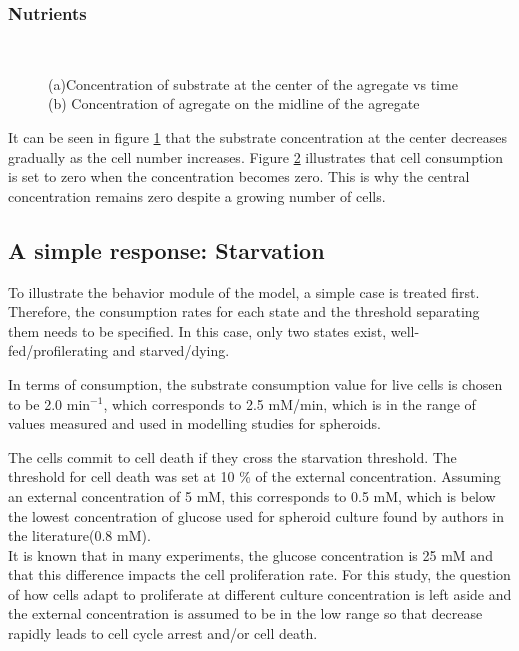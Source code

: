 \documentclass[11pt,a4paper]{article}
\begin{document}
\subsubsection{Nutrients}
\begin{figure}[ht!]
\begin{subfigure}{0.5\textwidth}
	\centering
	
	\caption{ \label{ref_S_center}}
\end{subfigure}
~~
\begin{subfigure}{0.5\textwidth}
	\centering
	
	\caption{\label{S_ref_midline}}
\end{subfigure}
\caption{(a)Concentration of substrate at the center of the agregate vs time (b) Concentration of agregate on the midline of the agregate \label{ref_nutrients}}
\end{figure}

It can be seen in figure \ref{ref_S_center} that the  substrate concentration at the center decreases gradually as the cell number increases. Figure \ref{S_ref_midline} illustrates that cell consumption is set to zero when the concentration becomes zero. This is why the central concentration remains zero despite a growing number of cells.

\subsection{A simple response: Starvation}
To illustrate the behavior module of the model, a simple case is treated first. Therefore, the consumption rates for each state and the threshold separating them needs to be specified. In this case, only two states exist, well-fed/profilerating and starved/dying.

In terms of consumption, the substrate consumption value for live cells is chosen to be 2.0 min$^{-1}$, which corresponds to 2.5 mM/min, which is in the range of values measured and used in modelling studies for spheroids.\cite{Mao2018}\cite{Kempf2005}

The cells commit to cell death if they cross the starvation threshold. The threshold for cell death was set at 10 \% of the external concentration. Assuming an external concentration of 5 mM, this corresponds to 0.5 mM, which is below the lowest concentration of glucose used for spheroid culture found by authors in the literature(0.8 mM).\cite{Freyer1986}\\

It is known that in many experiments, the glucose concentration is 25 mM and that this difference impacts the cell proliferation rate. For this study, the question of how cells adapt to proliferate at different culture concentration is left aside and the external concentration is assumed to be in the low range so that decrease rapidly leads to cell cycle arrest and/or cell death.
\\
\end{document}
